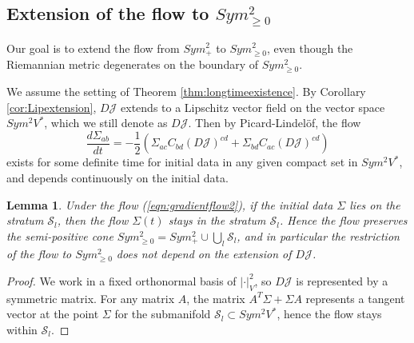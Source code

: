 \documentclass[a4paper]{article}
\newtheorem{lem}[thm]{Lemma}
\theoremstyle{definition}
\newcommand{\1}{\mathbbm{1}}
\begin{document}
	
	
	
	
	
	
	
	
	
	
	
	\subsection{Extension of the flow to $Sym^2_{\geq 0}$}\label{sect:extensionflow}
	
	
	
	
	
	
	
	Our goal is to extend the flow from $Sym^2_+$ to $Sym^2_{\geq 0}$, even though the Riemannian metric degenerates on the boundary of $Sym^2_{\geq 0}$.
	
	
	
	
	
	
	
	
	We assume the setting of Theorem \ref{thm:longtimeexistence}. By Corollary \ref{cor:Lipextension}, 
	$D\mathcal{J}$ extends to a Lipschitz  vector field on the vector space $Sym^2 V^*$, which we still denote as $D\mathcal{J}$. Then by Picard-Lindel\"of, the flow 
	\begin{equation}\label{eqn:gradientflow2}
		\frac{d\Sigma_{ab}}{dt}= - \frac{1}{2} (\Sigma_{ac} C_{bd} (D \mathcal{J})^{cd}   +  \Sigma_{bd} C_{ac}  (D \mathcal{J})^{cd}    )
	\end{equation}
	exists for some definite time for initial data in any given compact set in $Sym^2 V^*$, and depends continuously on the initial data. 
	
	
	
	\begin{lem}
		Under the flow (\ref{eqn:gradientflow2}), if the initial data $\Sigma$ lies on the stratum $\mathcal{S}_l$, then the flow $\Sigma(t)$ stays in the stratum $\mathcal{S}_l$. Hence the flow preserves the semi-positive cone $Sym^2_{\geq 0}= Sym^2_+\cup \bigcup_l \mathcal{S}_l$, and in particular the restriction of the flow to $Sym^2_{\geq 0}$ does not depend on the extension of $D\mathcal{J}$.
	\end{lem}
	
	
	
	
	\begin{proof}
		We work in a fixed orthonormal basis of $|\cdot|_V^2$, so $D\mathcal{J}$ is represented by a symmetric matrix.
		For any matrix $A$, the matrix $A^T\Sigma+ \Sigma A$ represents a tangent vector at the point $\Sigma$ for the submanifold $\mathcal{S}_l\subset Sym^2 V^*$, hence  the flow stays within $\mathcal{S}_l$.
	\end{proof}
	
\end{document}
